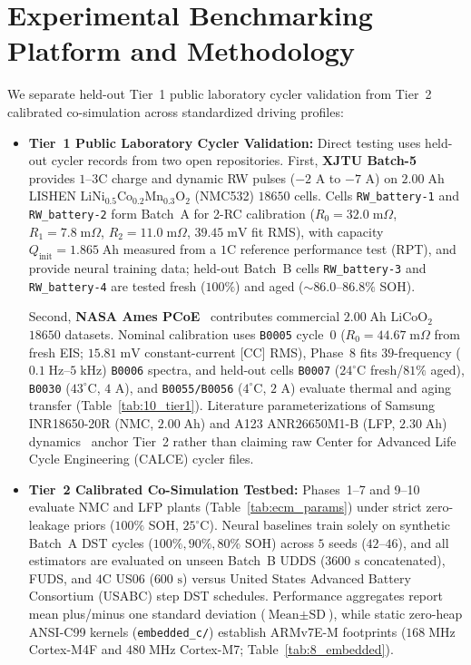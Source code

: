 \documentclass[10pt,a4paper]{article}
\begin{document}
\section{Experimental Benchmarking Platform and Methodology\label{sec:exp_setup}}
We separate held-out Tier~1 public laboratory cycler validation from Tier~2 calibrated co-simulation across standardized driving profiles:
\begin{itemize}
\item \textbf{Tier~1 Public Laboratory Cycler Validation:} Direct testing uses held-out cycler records from two open repositories. First, \textbf{XJTU Batch-5}~\cite{Wang2024xjtu} provides $1\text{--}3\text{C}$ charge and dynamic RW pulses ($-2\text{ A}$ to $-7\text{ A}$) on $2.00\;\mathrm{Ah}$ LISHEN $\text{LiNi}_{0.5}\text{Co}_{0.2}\text{Mn}_{0.3}\text{O}_2$ (NMC532) $18650$ cells. Cells \texttt{RW\_battery-1} and \texttt{RW\_battery-2} form Batch~A for 2-RC calibration ($R_0 = 32.0\;\mathrm{m}\Omega$, $R_1 = 7.8\;\mathrm{m}\Omega$, $R_2 = 11.0\;\mathrm{m}\Omega$, $39.45\;\mathrm{mV}$ fit RMS), with capacity $Q_{\text{init}} = 1.865\;\mathrm{Ah}$ measured from a $1\text{C}$ reference performance test (RPT), and provide neural training data; held-out Batch~B cells \texttt{RW\_battery-3} and \texttt{RW\_battery-4} are tested fresh ($100\%$) and aged ($\sim 86.0\text{--}86.8\%$ SOH).

Second, \textbf{NASA Ames PCoE}~\cite{Saha2007nasa} contributes commercial $2.00\;\mathrm{Ah}$ $\text{LiCoO}_2$ $18650$ datasets. Nominal calibration uses \texttt{B0005} cycle~0 ($R_0 = 44.67\;\mathrm{m}\Omega$ from fresh EIS; $15.81\;\mathrm{mV}$ constant-current [CC] RMS), Phase~8 fits $39$-frequency ($0.1\;\mathrm{Hz}\text{--}5\;\mathrm{kHz}$) \texttt{B0006} spectra, and held-out cells \texttt{B0007} ($24^\circ\text{C}$ fresh/$81\%$ aged), \texttt{B0030} ($43^\circ\text{C}$, $4\text{ A}$), and \texttt{B0055/B0056} ($4^\circ\text{C}$, $2\text{ A}$) evaluate thermal and aging transfer (Table~\ref{tab:10_tier1}). Literature parameterizations of Samsung INR18650-20R (NMC, $2.00\;\mathrm{Ah}$) and A123 ANR26650M1-B (LFP, $2.30\;\mathrm{Ah}$) dynamics~\cite{He2011ecm,Hu2012ecm,Birkl2017diagnostics,Pecht2011calce} anchor Tier~2 rather than claiming raw Center for Advanced Life Cycle Engineering (CALCE) cycler files.
\item \textbf{Tier~2 Calibrated Co-Simulation Testbed:} Phases~1--7 and 9--10 evaluate NMC and LFP plants (Table~\ref{tab:ecm_params}) under strict zero-leakage priors ($100\%$ SOH, $25^\circ\text{C}$). Neural baselines train solely on synthetic Batch~A DST cycles ($100\%, 90\%, 80\%$ SOH) across $5$ seeds ($42\text{--}46$), and all estimators are evaluated on unseen Batch~B UDDS ($3600\text{ s}$ concatenated), FUDS, and $4\text{C}$ US06 ($600\text{ s}$) versus United States Advanced Battery Consortium (USABC) step DST schedules. Performance aggregates report mean plus/minus one standard deviation ($\text{Mean}\pm\text{SD}$), while static zero-heap ANSI-C99 kernels (\texttt{embedded\_c/}) establish ARMv7E-M footprints ($168\;\mathrm{MHz}$ Cortex-M4F and $480\;\mathrm{MHz}$ Cortex-M7; Table~\ref{tab:8_embedded}).
\end{itemize}
\end{document}
